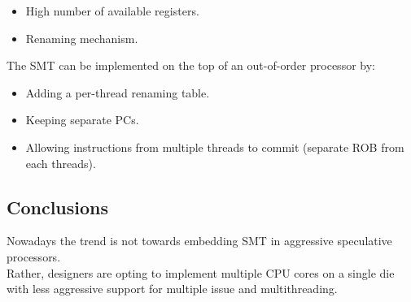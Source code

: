 \documentclass[12pt]{article}
\begin{document}
\begin{itemize}
  \item High number of available registers.
  \item Renaming mechanism.
\end{itemize}
The SMT can be implemented on the top of an out-of-order processor by:
\begin{itemize}
  \item Adding a per-thread renaming table.
  \item Keeping separate PCs.
  \item Allowing instructions from multiple threads to commit (separate ROB from each threads).
\end{itemize}

\subsection{Conclusions}
Nowadays the trend is not towards embedding SMT in aggressive speculative processors.\\
Rather, designers are opting to implement multiple CPU cores on a single die with less aggressive support for multiple issue and multithreading.
\end{document}
